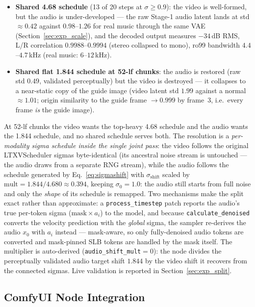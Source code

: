 \documentclass[12pt]{article}
\begin{document}
\begin{itemize}[leftmargin=*,noitemsep]
\item \textbf{Shared 4.68 schedule} (13 of 20 steps at $\sigma\ge0.9$):
  the video is well-formed, but the audio is under-developed --- the raw
  Stage-1 audio latent lands at std $\approx0.42$ against $0.98$--$1.26$
  for real music through the same VAE (Section~\ref{sec:exp_scale}), and
  the decoded output measures $-34$\,dB RMS, L/R correlation
  $0.9988$--$0.9994$ (stereo collapsed to mono), ro99 bandwidth
  $4.4$--$4.7$\,kHz (real music: $6$--$12$\,kHz).
\item \textbf{Shared flat 1.844 schedule at 52-lf chunks}: the audio is
  restored (raw std $0.49$, validated perceptually) but the video is destroyed
  --- it collapses to a near-static copy of the guide image (video latent
  std $1.99$ against a normal $\approx1.01$; origin similarity to the guide
  frame $\to0.999$ by frame~3, i.e.\ every frame \emph{is} the guide image).
\end{itemize}

At 52-lf chunks the video wants the top-heavy 4.68 schedule and the audio
wants the 1.844 schedule, and no shared schedule serves both.  The
resolution is a \emph{per-modality sigma schedule inside the single joint
pass}: the video follows the original LTXVScheduler sigmas byte-identical
(its ancestral noise stream is untouched --- the audio draws from a separate
RNG stream), while the audio follows the schedule generated by
Eq.~\eqref{eq:sigmashift} with $\sigma_{\text{shift}}$ scaled by
$\text{mult} = 1.844/4.680 \approx 0.394$, keeping $\sigma_0 = 1.0$: the
audio still starts from full noise and only the \emph{shape} of its
schedule is remapped.  Two mechanisms make the split exact rather than
approximate: a \texttt{process\_timestep} patch reports the audio's true
per-token sigma ($\text{mask}\times a_i$) to the model, and because
\texttt{calculate\_denoised} converts the velocity prediction with the
\emph{global} sigma, the sampler re-derives the audio $x_0$ with $a_i$
instead --- mask-aware, so only fully-denoised audio tokens are converted
and mask-pinned SLB tokens are handled by the mask itself.  The multiplier
is auto-derived (\texttt{audio\_shift\_mult}$=0$): the node divides the
perceptually validated audio target shift $1.844$ by the video shift it recovers
from the connected sigmas.  Live validation is reported in
Section~\ref{sec:exp_split}.

\subsection{ComfyUI Node Integration}
\label{sec:nodes}
\end{document}
